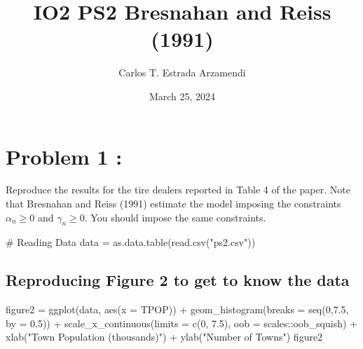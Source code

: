 \documentclass[
  a4paper,
  DIV=11,
  numbers=noendperiod]{scrartcl}
\title{IO2 PS2 Bresnahan and Reiss (1991)}
\author{Carlos T. Estrada Arzamendi}
\date{March 25, 2024}
\newenvironment{Shaded}{\begin{snugshade}}{\end{snugshade}}
\newcommand{\AttributeTok}[1]{\textcolor[rgb]{0.40,0.45,0.13}{#1}}
\newcommand{\CommentTok}[1]{\textcolor[rgb]{0.37,0.37,0.37}{#1}}
\newcommand{\DecValTok}[1]{\textcolor[rgb]{0.68,0.00,0.00}{#1}}
\newcommand{\FloatTok}[1]{\textcolor[rgb]{0.68,0.00,0.00}{#1}}
\newcommand{\FunctionTok}[1]{\textcolor[rgb]{0.28,0.35,0.67}{#1}}
\newcommand{\NormalTok}[1]{\textcolor[rgb]{0.00,0.23,0.31}{#1}}
\newcommand{\OtherTok}[1]{\textcolor[rgb]{0.00,0.23,0.31}{#1}}
\newcommand{\SpecialCharTok}[1]{\textcolor[rgb]{0.37,0.37,0.37}{#1}}
\newcommand{\StringTok}[1]{\textcolor[rgb]{0.13,0.47,0.30}{#1}}
\begin{document}
\maketitle

\section{Problem 1 :}\label{problem-1}

Reproduce the results for the tire dealers reported in Table 4 of the
paper. Note that Bresnahan and Reiss (1991) estimate the model imposing
the constraints \(\alpha_n \geq 0\) and \(\gamma_n \geq 0\). You should
impose the same constraints.

\begin{Shaded}
\begin{Highlighting}[numbers=left,,]
\CommentTok{\# Reading Data}
\NormalTok{data }\OtherTok{=} \FunctionTok{as.data.table}\NormalTok{(}\FunctionTok{read.csv}\NormalTok{(}\StringTok{"ps2.csv"}\NormalTok{))}
\end{Highlighting}
\end{Shaded}

\subsection{Reproducing Figure 2 to get to know the
data}\label{reproducing-figure-2-to-get-to-know-the-data}

\begin{Shaded}
\begin{Highlighting}[numbers=left,,]
\NormalTok{figure2 }\OtherTok{=} \FunctionTok{ggplot}\NormalTok{(data, }\FunctionTok{aes}\NormalTok{(}\AttributeTok{x =}\NormalTok{ TPOP)) }\SpecialCharTok{+} 
                \FunctionTok{geom\_histogram}\NormalTok{(}\AttributeTok{breaks =} \FunctionTok{seq}\NormalTok{(}\DecValTok{0}\NormalTok{,}\FloatTok{7.5}\NormalTok{, }\AttributeTok{by =} \FloatTok{0.5}\NormalTok{)) }\SpecialCharTok{+} 
                \FunctionTok{scale\_x\_continuous}\NormalTok{(}\AttributeTok{limits =} \FunctionTok{c}\NormalTok{(}\DecValTok{0}\NormalTok{, }\FloatTok{7.5}\NormalTok{), }\AttributeTok{oob =}\NormalTok{ scales}\SpecialCharTok{::}\NormalTok{oob\_squish) }\SpecialCharTok{+}
                \FunctionTok{xlab}\NormalTok{(}\StringTok{"Town Population (thousands)"}\NormalTok{) }\SpecialCharTok{+}
                \FunctionTok{ylab}\NormalTok{(}\StringTok{"Number of Towns"}\NormalTok{)}
\NormalTok{figure2}
\end{Highlighting}
\end{Shaded}
\end{document}
